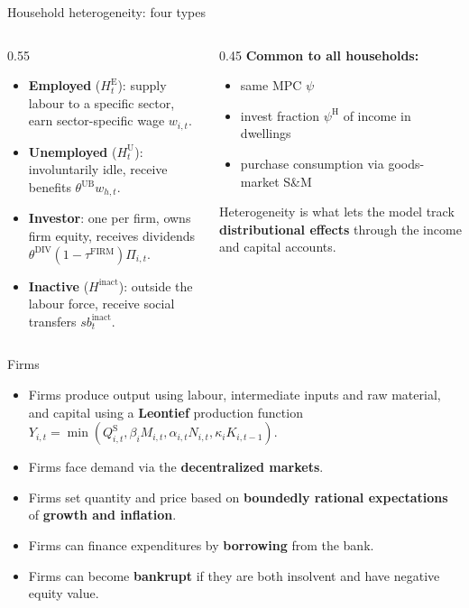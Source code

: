 \documentclass[9pt]{beamer}
\begin{document}
\begin{frame}{Household heterogeneity: four types}
    \begin{columns}
    \begin{column}{0.55\textwidth}
    \begin{itemize}\setlength\itemsep{0.3em}
        \item \textbf{Employed} ($H^{\mathrm{E}}_t$): supply labour to a specific sector, earn sector-specific wage $w_{i,t}$.
        \item \textbf{Unemployed} ($H^{\mathrm{U}}_t$): involuntarily idle, receive benefits $\theta^{\mathrm{UB}} w_{h,t}$.
        \item \textbf{Investor}: one per firm, owns firm equity, receives dividends $\theta^{\mathrm{DIV}}(1-\tau^{\mathrm{FIRM}})\Pi_{i,t}$.
        \item \textbf{Inactive} ($H^{\mathrm{inact}}$): outside the labour force, receive social transfers $sb^{\mathrm{inact}}_t$.
    \end{itemize}
    \end{column}
    \begin{column}{0.45\textwidth}
    \footnotesize
    \textbf{Common to all households:}
    \begin{itemize}
        \item same MPC $\psi $
        \item invest fraction $\psi^{\mathrm{H}}$ of income in dwellings
        \item purchase consumption via goods-market S\&M
    \end{itemize}
    \vspace{0.3em}
    Heterogeneity is what lets the model track \textbf{distributional effects} through the income and capital accounts.
    \end{column}
    \end{columns}
\end{frame}

\begin{frame}{Firms}
    \begin{itemize}
        \item Firms produce output using labour, intermediate inputs and raw material, and capital using a \textbf{Leontief} production function $Y_{i,t}=\min \left(Q_{i,t}^{\mathrm{S}}, \beta_i M_{i,t}, \alpha_{i,t} N_{i,t}, \kappa_i K_{i,t-1}\right).$
        \item Firms face demand via the \textbf{decentralized markets}.
        \item Firms set quantity and price based on \textbf{boundedly rational expectations} of \textbf{growth and inflation}.
        \item Firms can finance expenditures by \textbf{borrowing} from the bank.
        \item Firms can become \textbf{bankrupt} if they are both insolvent and have negative equity value.
    \end{itemize}
\end{frame}
\end{document}
